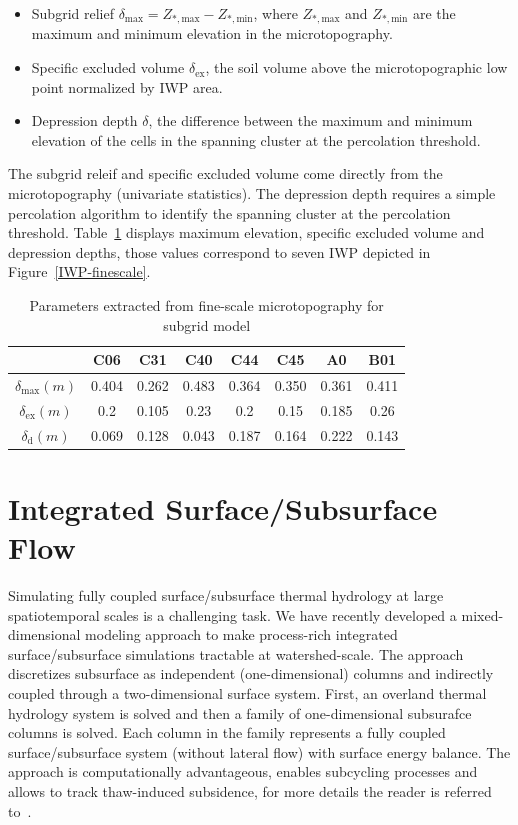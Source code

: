 \documentclass[review,11pt]{elsarticle}
\begin{document}
\begin{itemize}
\item Subgrid relief $\delta_\text{max} = Z_{*,\text{max}} -   Z_{*,\text{min}}$, where  $Z_{*,\text{max}}$ and  $Z_{*,\text{min}}$ are the maximum and minimum elevation in the microtopography. 
\item Specific excluded volume $\delta_\text{ex}$, the soil volume above the microtopographic low point normalized by IWP area.
\item Depression depth $\delta$, the difference between the maximum and minimum elevation of the cells in the spanning cluster at the percolation threshold.
\end{itemize}
The subgrid releif and specific excluded volume come directly from the microtopography (univariate statistics). The depression depth requires a simple percolation algorithm to identify the spanning cluster at the percolation threshold. Table~\ref{subgrid-para} displays maximum elevation, specific excluded volume and depression depths, those values correspond to seven IWP depicted in Figure~\ref{IWP-finescale}.

\begin{center}
\begin{table}[htbp]
\caption{Parameters extracted from fine-scale microtopography for subgrid model}\label{subgrid-para}
\begin{tabular}{| c |c|c|c|c|c|c|c|}
\hline
& C06 & C31 & C40 & C44 & C45 & A0 & B01 \\ \hline
 $\delta_\text{max}(m)$ & 0.404 & 0.262 & 0.483 & 0.364 & 0.350 & 0.361 & 0.411 \\ \hline
$\delta_\text{ex}(m)$ & 0.2 & 0.105 & 0.23 & 0.2 & 0.15 & 0.185 & 0.26\\ \hline
$ \delta_\text{d}(m)$ & 0.069 & 0.128 & 0.043 & 0.187 & 0.164 & 0.222 & 0.143 \\ \hline
\end{tabular}

\end{table}
\end{center}
\section{Integrated Surface/Subsurface Flow}%
Simulating fully coupled surface/subsurface thermal hydrology at large spatiotemporal scales is a challenging task. We have recently developed a mixed-dimensional modeling approach to make process-rich integrated surface/subsurface simulations tractable at watershed-scale. The approach discretizes subsurface as independent (one-dimensional) columns and indirectly coupled through a two-dimensional surface system. First, an overland thermal hydrology system is solved and then a family of one-dimensional subsurafce columns is solved. Each column in the family represents a fully coupled surface/subsurface system (without lateral flow) with surface energy balance. The approach is computationally advantageous, enables subcycling processes and allows to track thaw-induced subsidence, for more details the reader is referred to~\cite{jan2017}.
\end{document}
